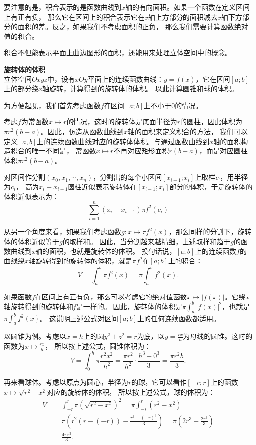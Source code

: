 \documentclass[12pt,UTF8]{ctexbook}
\begin{document}
要注意的是，积合表示的是函数曲线到$x$轴的有向面积。如果一个函数在定义区间上有正有负，
那么它在区间上的积合表示它在$x$轴上方部分的面积减去$x$轴下方部分的面积的差。反之，如果我们不考虑面积的正负，
那么我们需要计算函数绝对值的积合。

积合不但能表示平面上曲边图形的面积，还能用来处理立体空间中的概念。

\begin{et}{\textbf{旋转体的体积}}\\
    立体空间$Oxyz$中，设有$xOy$平面上的连续函数曲线：$y = f(x)$，它在区间$[a;b]$上的部分绕$x$轴旋转，计算得到的旋转体的体积。
    以此计算圆锥和球的体积。
\end{et}

\begin{so}
    为方便起见，我们首先考虑函数$f$在区间$[a;b]$上不小于$0$的情况。

    考虑$f$为常函数$x\mapsto r$的情况，这时的旋转体是底面半径为$r$的圆柱，因此体积为$\pi r^2 (b - a)$。因此，仿造从函数曲线到$x$轴的面积来定义积合的方法，
    我们可以定义$[a,b]$上的连续函数曲线对应的旋转体体积。与通过函数曲线到$x$轴的面积构造积合的唯一不同是，
    常函数$x\mapsto r$不再对应矩形面积$r(b - a)$，而是对应圆柱体积$\pi r^2 (b - a)$。
    
    对区间作分割$(x_0, x_1, \cdots, x_n)$，分割出的每个小区间$[x_{i-1};x_i]$上取样$c_i$，用半径为$c_i$，
    高为$x_i - x_{i-1}$圆柱近似表示旋转体在$[x_{i-1};x_i]$部分的体积，于是旋转体的体积近似表示为：
    $$ \sum_{i=1}^n (x_i - x_{i-1}) \pi f^2(c_i) $$

    从另一个角度来看，如果我们考虑函数$g: x\mapsto \pi f^2(x)$，那么同样的分割下，旋转体的体积近似等于$g$的取样和。
    因此，当分割越来越精细，上述取样和趋于$g$的函数曲线到$x$轴的面积，也就是旋转体的体积。
    换句话说，$[a;b]$上的连续函数$f$的曲线绕$x$轴旋转得到的旋转体的体积，就是$\pi f^2$在$[a;b]$上的积合：
    $$ V = \int_a^b \pi f^2(x) = \pi \int_a^b f^2(x). $$

    如果函数$f$在区间上有正有负，那么可以考虑它的绝对值函数$x\mapsto |f(x)|$。它绕$x$轴旋转得到的旋转体和$f$是一样的。
    因此，旋转体的体积是$ \pi \int_a^b |f(x)|^2$，也就是$ \pi \int_a^b f^2(x)$。
    这说明上述公式对区间$[a;b]$上的任何连续函数都适用。

    以圆锥为例。考虑以$x = h$上的圆$y^2 + z^2 = r$为底，以$y = \frac{rx}{h}$为母线的圆锥。这时的函数为$x\mapsto \frac{rx}{h}$，
    所以按上述公式，圆锥体积为：
    $$ V = \int_0^h \pi \frac{r^2x^2}{h^2} = \frac{\pi r^2}{h^2}\cdot \frac{h^3 - 0^3}{3} = \frac{\pi r^2h}{3}. $$

    再来看球体。考虑以原点为圆心，半径为$r$的球。它可以看作$[-r;r]$上的函数$x\mapsto \sqrt{r^2 - x^2}$对应的旋转体的体积。
    所以按上述公式，球的体积为：
    \begin{align*}
        V &= \int_{-r}^r \pi \left(\sqrt{r^2 - x^2}\right)^2 = \pi \int_{-r}^r \left(r^2 - x^2\right) \\
        &= \pi \left(r^2(r - (-r)) - \frac{r^3 - (-r)^3}{3}\right) = \pi \left(2r^3 - \frac{2r^3}{3}\right) \\
        &= \frac{4\pi r^3}{3}.
    \end{align*}
\end{so}
\end{document}
